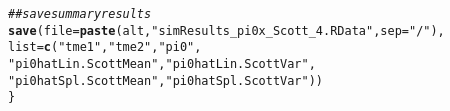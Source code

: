 \documentclass{article}\usepackage[]{graphicx}\usepackage[]{color}
\makeatletter
\newcommand{\hlstr}[1]{\textcolor[rgb]{0.192,0.494,0.8}{#1}}%
\newcommand{\hlcom}[1]{\textcolor[rgb]{0.678,0.584,0.686}{\textit{#1}}}%
\newcommand{\hlstd}[1]{\textcolor[rgb]{0.345,0.345,0.345}{#1}}%
\newcommand{\hlkwc}[1]{\textcolor[rgb]{0.333,0.667,0.333}{#1}}%
\newcommand{\hlkwd}[1]{\textcolor[rgb]{0.737,0.353,0.396}{\textbf{#1}}}%
\newenvironment{kframe}{%
 \def\at@end@of@kframe{}%
 \ifinner\ifhmode%
  \def\at@end@of@kframe{\end{minipage}}%
  \begin{minipage}{\columnwidth}%
 \fi\fi%
 \def\FrameCommand##1{\hskip\@totalleftmargin \hskip-\fboxsep
 \colorbox{shadecolor}{##1}\hskip-\fboxsep
     \hskip-\linewidth \hskip-\@totalleftmargin \hskip\columnwidth}%
 \MakeFramed {\advance\hsize-\width
   \@totalleftmargin\z@ \linewidth\hsize
   \@setminipage}}%
 {\par\unskip\endMakeFramed%
 \at@end@of@kframe}
\newenvironment{knitrout}{}{} %
\makeatother
\begin{document}
\begin{knitrout}
\begin{kframe}
\begin{alltt}
  \hlcom{##save summary results}
  \hlkwd{save}\hlstd{(}\hlkwc{file}\hlstd{=}\hlkwd{paste}\hlstd{(alt,}\hlstr{"simResults_pi0x_Scott_4.RData"}\hlstd{,}\hlkwc{sep}\hlstd{=}\hlstr{"/"}\hlstd{),}
       \hlkwc{list}\hlstd{=}\hlkwd{c}\hlstd{(}\hlstr{"tme1"}\hlstd{,} \hlstr{"tme2"}\hlstd{,} \hlstr{"pi0"}\hlstd{,}
              \hlstr{"pi0hatLin.ScottMean"}\hlstd{,} \hlstr{"pi0hatLin.ScottVar"}\hlstd{,}
              \hlstr{"pi0hatSpl.ScottMean"}\hlstd{,} \hlstr{"pi0hatSpl.ScottVar"}\hlstd{))}
\hlstd{\}}
\end{alltt}


{\ttfamily\noindent\color{warningcolor}{\#\# Warning in apply(as.matrix(pi0hatScottMat), 2, as.numeric): NAs introduced by coercion}}

{\ttfamily\noindent\bfseries\color{errorcolor}{\#\# Error in apply(as.matrix(pi0hatScottMat), 2, as.numeric): (list) object cannot be coerced to type 'double'}}\end{kframe}
\end{knitrout}
\end{document}
